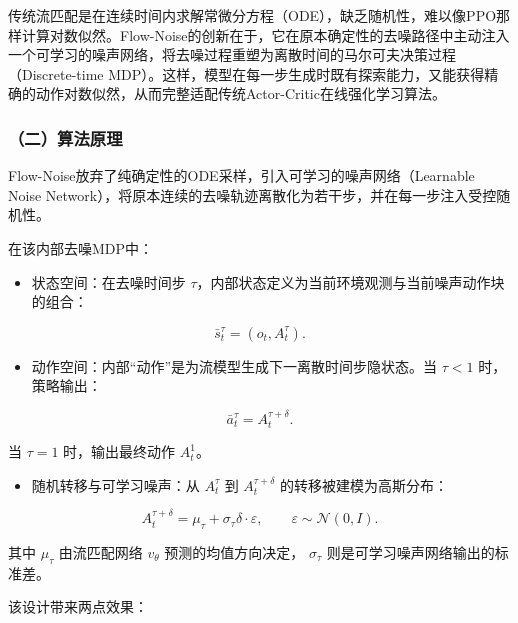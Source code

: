 传统流匹配是在连续时间内求解常微分方程（ODE），缺乏随机性，难以像PPO那样计算对数似然。Flow-Noise的创新在于，它在原本确定性的去噪路径中主动注入一个可学习的噪声网络，将去噪过程重塑为离散时间的马尔可夫决策过程（Discrete-time MDP）。这样，模型在每一步生成时既有探索能力，又能获得精确的动作对数似然，从而完整适配传统Actor-Critic在线强化学习算法。

\hypertarget{ux4e8cux7b97ux6cd5ux539fux7406}{%
\subsubsection{（二）算法原理}\label{ux4e8cux7b97ux6cd5ux539fux7406}}

Flow-Noise放弃了纯确定性的ODE采样，引入可学习的噪声网络（Learnable Noise Network），将原本连续的去噪轨迹离散化为若干步，并在每一步注入受控随机性。

在该内部去噪MDP中：

\begin{itemize}
\tightlist
\item
{}
  状态空间：在去噪时间步 \(\tau\)，内部状态定义为当前环境观测与当前噪声动作块的组合：
\end{itemize}

\[
\bar{s}_t^\tau=(o_t,A_t^\tau).
\]

\begin{itemize}
\tightlist
\item
{}
  动作空间：内部``动作''是为流模型生成下一离散时间步隐状态。当 \(\tau<1\) 时，策略输出：
\end{itemize}

\[
\bar{a}_t^\tau=A_t^{\tau+\delta}.
\]

当 \(\tau=1\) 时，输出最终动作 \(A_t^1\)。

\begin{itemize}
\tightlist
\item
{}
  随机转移与可学习噪声：从 \(A_t^\tau\) 到 \(A_t^{\tau+\delta}\) 的转移被建模为高斯分布：
\end{itemize}

\[
A_t^{\tau+\delta}=\mu_\tau+\sigma_\tau\delta\cdot\varepsilon,
\qquad \varepsilon\sim\mathcal{N}(0,I).
\]

其中 \(\mu_\tau\) 由流匹配网络 \(v_\theta\) 预测的均值方向决定， \(\sigma_\tau\) 则是可学习噪声网络输出的标准差。

该设计带来两点效果：

